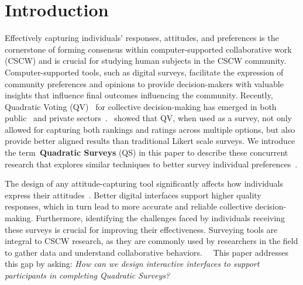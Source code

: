 \section{Introduction}
Effectively capturing individuals' responses, attitudes, and preferences is the cornerstone of forming consensus within computer-supported collaborative work (CSCW) and is crucial for studying human subjects in the CSCW community. Computer-supported tools, such as digital surveys, facilitate the expression of community preferences and opinions to provide decision-makers with valuable insights that influence final outcomes influencing the community. Recently, Quadratic Voting (QV)~\cite{posner2018radical} for collective decision-making has emerged in both public~\cite{rogersColoradoTriedNew2019, QuadraticVotingColorado, teamTaiwanDigitalMinister} and private sectors~\cite{Gov4gitDecentralizedPlatform2023}.~\textcite{chengCanShowWhat2021} showed that QV, when used as a survey, not only allowed for capturing both rankings and ratings across multiple options, but also provide better aligned results than traditional Likert scale surveys. We introduce the term~\textbf{Quadratic Surveys} (QS) in this paper to describe these concurrent research that explores similar techniques to better survey individual preferences~\cite{quarfoot2017quadratic, chengCanShowWhat2021}.

The design of any attitude-capturing tool significantly affects how individuals express their attitudes~\cite{engstrom2020politics, weijtersEffectRatingScale2010, kierujVariationsResponseStyle2010, toepoelSmileysStarsHearts2019, farzandAestheticsEvaluatingResponse2024, xiaoTellMeYourself2020, pielotDidYouMisclick2024}. Better digital interfaces support higher quality responses, which in turn lead to more accurate and reliable collective decision-making. Furthermore, identifying the challenges faced by individuals receiving these surveys is crucial for improving their effectiveness. Surveying tools are integral to CSCW research, as they are commonly used by researchers in the field to gather data and understand collaborative behaviors.~~ This paper addresses this gap by asking: \textit{How can we design interactive interfaces to support participants in completing Quadratic Surveys?}

